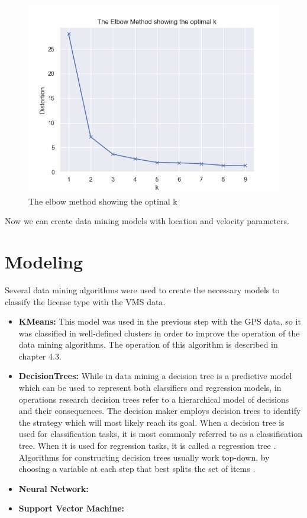 \begin{figure}[H]
    \centering
    \includegraphics[width=0.8\linewidth]{Chapters/img/elbow_method_server.png}
    \caption{The elbow method showing the optinal k}
    \label{fig:elbow_method_server}
\end{figure}
Now we can create data mining models with location and velocity parameters.



\section{Modeling} %
\label{sub:modeling}
Several data mining algorithms were used to create the necessary models to classify the license type with the VMS data.
\begin{itemize}
\item \textbf{ KMeans:} This model was used in the previous step with the GPS data, so it was classified in well-defined clusters in order to improve the operation of the data mining algorithms. The operation of this algorithm is described in chapter 4.3.

\item \textbf{ DecisionTrees: }
While in data mining a decision tree is a predictive model which can be used to represent both classifiers and regression models, in operations research decision trees refer to a hierarchical model of decisions and their consequences. The decision maker employs decision trees to identify the strategy which will most likely reach its goal. When a decision tree is used for classification tasks, it is most commonly referred to as a classification tree. When it is used for regression tasks, it is called a regression tree \cite{Rokach2014}.
Algorithms for constructing decision trees usually work top-down, by choosing a variable at each step that best splits the set of items \cite{ApplicationsReviews}.

\item \textbf{Neural Network: }
\item \textbf{Support Vector Machine: }
\end{itemize}


